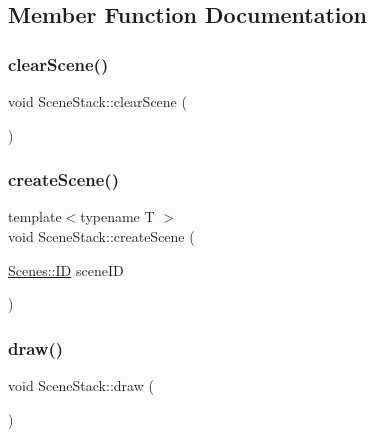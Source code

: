 \subsection{Member Function Documentation}
\mbox{\label{class_scene_stack_a70253c72c07f5d5c5d77861d064b8470}} 
\subsubsection{\texorpdfstring{clear\+Scene()}{clearScene()}}
{\footnotesize\ttfamily void Scene\+Stack\+::clear\+Scene (\begin{DoxyParamCaption}{ }\end{DoxyParamCaption})}

\mbox{\label{class_scene_stack_a129b49c7bc280aeaf7c71235b3d9648d}} 
\subsubsection{\texorpdfstring{create\+Scene()}{createScene()}}
{\footnotesize\ttfamily template$<$typename T $>$ \\
void Scene\+Stack\+::create\+Scene (\begin{DoxyParamCaption}\item[{\hyperlink{namespace_scenes_a0ad7ab6856b1d77d498e3a251f6bb275}{Scenes\+::\+ID}}]{scene\+ID }\end{DoxyParamCaption})}

\mbox{\label{class_scene_stack_ab4a68b2247289ba1d934067aad35159d}} 
\subsubsection{\texorpdfstring{draw()}{draw()}}
{\footnotesize\ttfamily void Scene\+Stack\+::draw (\begin{DoxyParamCaption}{ }\end{DoxyParamCaption})}

\mbox{\label{class_scene_stack_aecf75add55f527c31528043f4b28db44}} 
